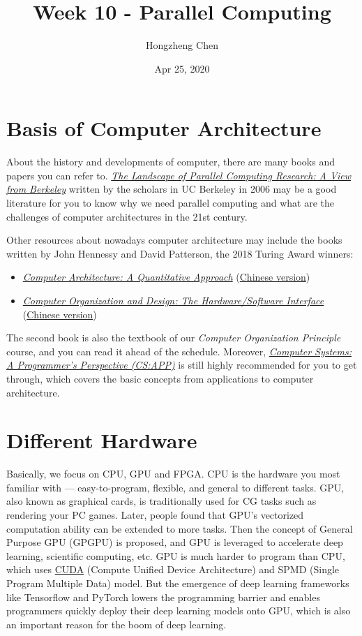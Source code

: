 \documentclass[english]{../TexTemplate/thesis}
\title{Week 10 - Parallel Computing}
\author{Hongzheng Chen}
\date{Apr 25, 2020}
\begin{document}
\maketitle

\section{Basis of Computer Architecture}
\label{sec:basis}
About the history and developments of computer, there are many books and papers you can refer to. \href{https://people.eecs.berkeley.edu/~krste/papers/BerkeleyView.pdf}{\emph{The Landscape of Parallel Computing Research: A View from
Berkeley}} written by the scholars in UC Berkeley in 2006 may be a good literature for you to know why we need parallel computing and what are the challenges of computer architectures in the 21st century.

Other resources about nowadays computer architecture may include the books written by John Hennessy and David Patterson, the 2018 Turing Award winners:
\begin{itemize}
	\item \href{http://uni-site.ir/khuelec/wp-content/uploads/Computer-Architecture-A-Quantitative-Approach.pdf}{\emph{Computer Architecture: A Quantitative Approach}} (\href{https://book.douban.com/subject/20452387/}{Chinese version})
	\item \href{http://ac.aua.am/arm/public/2017-Spring-Computer-Organization/Textbooks/ComputerOrganizationAndDesign5thEdition2014.pdf}{\emph{Computer Organization and Design: The Hardware/Software Interface}} (\href{https://book.douban.com/subject/26604008/}{Chinese version})
\end{itemize}
The second book is also the textbook of our \emph{Computer Organization Principle} course, and you can read it ahead of the schedule. Moreover, \href{https://csapp.cs.cmu.edu/}{\emph{Computer Systems: A Programmer's Perspective (CS:APP)}} is still highly recommended for you to get through, which covers the basic concepts from applications to computer architecture.

\section{Different Hardware}
Basically, we focus on CPU, GPU and FPGA.
CPU is the hardware you most familiar with --- easy-to-program, flexible, and general to different tasks.
GPU, also known as graphical cards, is traditionally used for CG tasks such as rendering your PC games. Later, people found that GPU's vectorized computation ability can be extended to more tasks. Then the concept of General Purpose GPU (GPGPU) is proposed, and GPU is leveraged to accelerate deep learning, scientific computing, etc.
GPU is much harder to program than CPU, which uses \href{https://developer.nvidia.com/cuda-zone}{CUDA} (Compute Unified Device Architecture) and SPMD (Single Program Multiple Data) model.
But the emergence of deep learning frameworks like Tensorflow and PyTorch lowers the programming barrier and enables programmers quickly deploy their deep learning models onto GPU, which is also an important reason for the boom of deep learning.
\end{document}
